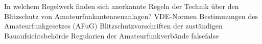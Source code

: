     {In welchem Regelwerk finden sich anerkannte Regeln der Technik über den Blitzschutz von Amateurfunkantennenanlagen?}
    {VDE-Normen}
    {Bestimmungen des Amateurfunkgesetzes (AFuG)}
    {Blitzschutzvorschriften der zuständigen Bauaufsichtsbehörde}
    {Regularien der Amateurfunkverbände}
    {false}{false}